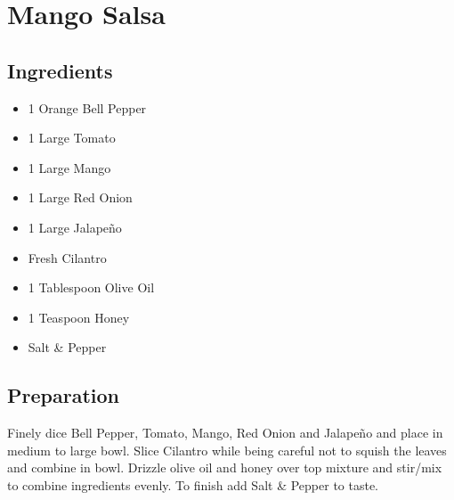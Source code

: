 \thispagestyle{fancy}
\section{Mango Salsa}
\AddToShipoutPicture*{\MangoSalsa}

\subsection*{Ingredients}
\begin{multicols}{3}
	\begin{itemize}
		\item 1 Orange Bell Pepper
		\item 1 Large Tomato
		\item 1 Large Mango
		\item 1 Large Red Onion
		\item 1 Large Jalape\~{n}o
		\item Fresh Cilantro
		\item 1 Tablespoon Olive Oil
		\item 1 Teaspoon Honey
		\item Salt \& Pepper  
	\end{itemize}
\end{multicols}

\subsection*{Preparation}
Finely dice Bell Pepper, Tomato, Mango, Red Onion and Jalape\~{n}o and place in medium to large bowl. Slice Cilantro while being careful not to squish the leaves and combine in bowl. Drizzle olive oil and honey over top mixture and stir/mix to combine ingredients evenly. To finish add Salt \& Pepper to taste.

